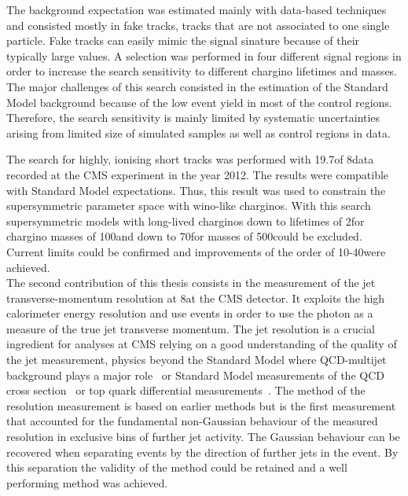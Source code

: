 The background expectation was estimated mainly with data-based techniques and consisted mostly in fake tracks, \ie tracks that are not associated to one single particle. 
Fake tracks can easily mimic the signal sinature because of their typically large \dedx values.
A selection was performed in four different signal regions in order to increase the search sensitivity to different chargino lifetimes and masses.
The major challenges of this search consisted in the estimation of the Standard Model background because of the low event yield in most of the control regions.
Therefore, the search sensitivity is mainly limited by systematic uncertainties arising from limited size of simulated samples as well as control regions in data.

The search for highly, ionising short tracks was performed with 19.7\fbinv of 8\tev data recorded at the CMS experiment in the year 2012.
The results were compatible with Standard Model expectations.
Thus, this result was used to constrain the supersymmetric parameter space with wino-like charginos.
With this search supersymmetric models with long-lived charginos down to lifetimes of 2\cm for chargino masses of 100\gev and down to 70\cm for masses of 500\gev could be excluded.
Current limits could be confirmed and improvements of the order of 10-40\gev were achieved.\\


The second contribution of this thesis consists in the measurement of the jet transverse-momentum resolution at 8\tev at the CMS detector.
It exploits the high calorimeter energy resolution and use \GAMJET events in order to use the photon as a measure of the true jet transverse momentum.
The jet \pt resolution is a crucial ingredient for analyses at CMS relying on a good understanding of the quality of the jet \pt measurement, \eg physics beyond the Standard Model where QCD-multijet background plays a major role~\cite{bib:CMS:RA2_8TeV,bib:CMS:MT2_8TeV,bib:CMS:AlphaT_8TeV} or Standard Model measurements of the QCD cross section~\cite{bib:CMS:QCD_measurements} or top quark differential measurements~\cite{bib:CMS:TopCrossSection_8TeV}.
The method of the resolution measurement is based on earlier methods but is the first measurement that accounted for the fundamental non-Gaussian behaviour of the measured resolution in exclusive bins of further jet activity.
The Gaussian behaviour can be recovered when separating events by the direction of further jets in the event.
By this separation the validity of the method could be retained and a well performing method was achieved.

